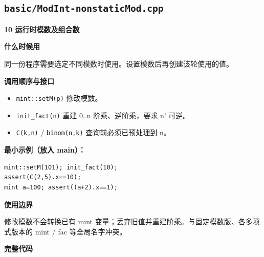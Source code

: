 \documentclass[UTF8,a4paper,10pt]{ctexart}
\newcommand{\TemplUsage}[1]{\textbf{什么时候用}\par #1\par}
\newcommand{\TemplApi}[1]{\textbf{调用顺序与接口}\par #1\par}
\newcommand{\TemplNote}[1]{\textbf{使用边界}\par #1\par}
\begin{document}
\subsection{\texttt{basic/ModInt-nonstaticMod.cpp}}
\textbf{10 运行时模数及组合数}

\TemplUsage{同一份程序需要选定不同模数时使用。设置模数后再创建该轮使用的值。}
\TemplApi{\begin{itemize}
\item \texttt{mint::setM(p)} 修改模数。
\item \texttt{init\_fact(n)} 重建 0..n 阶乘、逆阶乘，要求 n! 可逆。
\item \texttt{C(k,n)} / \texttt{binom(n,k)} 查询前必须已预处理到 n。
\end{itemize}}
\textbf{最小示例（放入 main）：}
\begin{lstlisting}
mint::setM(101); init_fact(10);
assert(C(2,5).x==10);
mint a=100; assert((a+2).x==1);
\end{lstlisting}
\TemplNote{修改模数不会转换已有 mint 变量；丢弃旧值并重建阶乘。与固定模数版、各多项式版本的 mint / fac 等全局名字冲突。}
\textbf{完整代码}
\end{document}

